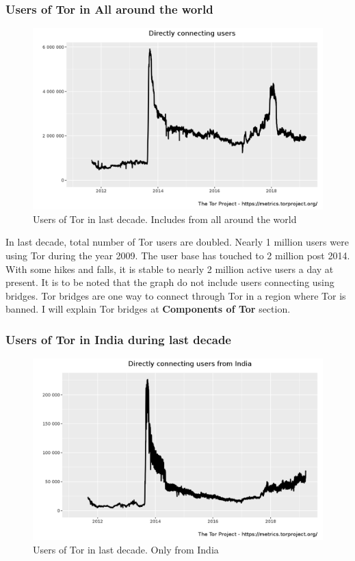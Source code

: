 \documentclass{article}
\begin{document}
    \subsubsection{Users of Tor in All around the world}
      \begin{figure}[h!]
        \includegraphics[width=\linewidth]{userstats-relay-country-all-last-decade.png}
        \caption{Users of Tor in last decade. Includes from all around the world}
        \label{fig:users_of_tor_from_all_around_the_world_last_decade}
      \end{figure}

      In last decade, total number of Tor users are doubled. Nearly 1 million
      users were using Tor during the year 2009. The user base has touched to 2
      million post 2014. With some hikes and falls, it is stable to nearly 2
      million active users a day at present. It is to be noted that the graph do
      not include users connecting using bridges. Tor bridges are one way to
      connect through Tor in a region where Tor is banned. I will explain Tor
      bridges at \textbf{Components of Tor} section.


    \subsubsection{Users of Tor in India during last decade}
      \begin{figure}[h!]
        \includegraphics[width=\linewidth]{userstats-relay-country-india-last-decade.png}
        \caption{Users of Tor in last decade. Only from India}
        \label{fig:users_of_tor_from_india_last_decade}
      \end{figure}
\end{document}
